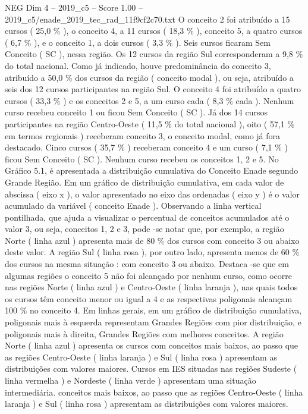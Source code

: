 \begin{textsample}{NEG Dim 4 – 2019\_c5 – Score 1.00 – 2019\_c5/enade\_2019\_tec\_rad\_11f9cf2c70.txt}
O conceito 2 foi atribuído a 15 cursos ( 25,0 \% ), o conceito 4, a 11 cursos ( 18,3 \% ), conceito 5, a quatro cursos ( 6,7 \% ), e o conceito 1, a dois cursos ( 3,3 \% ).
Seis cursos ficaram Sem Conceito ( SC ), nessa região.
Os 12 cursos da região Sul corresponderam a 9,8 \% do total nacional.
Como já indicado, houve predominância do conceito 3, atribuído a 50,0 \% dos cursos da região ( conceito modal ), ou seja, atribuído a seis dos 12 cursos participantes na região Sul.
O conceito 4 foi atribuído a quatro cursos ( 33,3 \% ) e os conceitos 2 e 5, a um curso cada ( 8,3 \% cada ).
Nenhum curso recebeu conceito 1 ou ficou Sem Conceito ( SC ).
Já dos 14 cursos participantes na região Centro-Oeste ( 11,5 \% do total nacional ), oito ( 57,1 \% em termos regionais ) receberam conceito 3, o conceito modal, como já fora destacado.
Cinco cursos ( 35,7 \% ) receberam conceito 4 e um curso ( 7,1 \% ) ficou Sem Conceito ( SC ).
Nenhum curso recebeu os conceitos 1, 2 e 5.
No Gráfico 5.1, é apresentada a distribuição cumulativa do Conceito Enade segundo Grande Região.
Em um gráfico de distribuição cumulativa, em cada valor de abscissa ( eixo x ), o valor apresentado no eixo das ordenadas ( eixo y ) é o valor acumulado da variável ( conceito Enade ).
Observando a linha vertical pontilhada, que ajuda a visualizar o percentual de conceitos acumulados até o valor 3, ou seja, conceitos 1, 2 e 3, pode -se notar que, por exemplo, a região Norte ( linha azul ) apresenta mais de 80 \% dos cursos com conceito 3 ou abaixo deste valor.
A região Sul ( linha rosa ), por outro lado, apresenta menos de 60 \% dos cursos na mesma situação : com conceito 3 ou abaixo.
Destaca -se que em algumas regiões o conceito 5 não foi alcançado por nenhum curso, como ocorre nas regiões Norte ( linha azul ) e Centro-Oeste ( linha laranja ), nas quais todos os cursos têm conceito menor ou igual a 4 e as respectivas poligonais alcançam 100 \% no conceito 4.
Em linhas gerais, em um gráfico de distribuição cumulativa, poligonais mais à esquerda representam Grandes Regiões com pior distribuição, e poligonais mais à direita, Grandes Regiões com melhores conceitos.
A região Norte ( linha azul ) apresenta os cursos com conceitos mais baixos, ao passo que as regiões Centro-Oeste ( linha laranja ) e Sul ( linha rosa ) apresentam as distribuições com valores maiores.
Cursos em IES situadas nas regiões Sudeste ( linha vermelha ) e Nordeste ( linha verde ) apresentam uma situação intermediária. conceitos mais baixos, ao passo que as regiões Centro-Oeste ( linha laranja ) e Sul ( linha rosa ) apresentam as distribuições com valores maiores.

\end{textsample}

